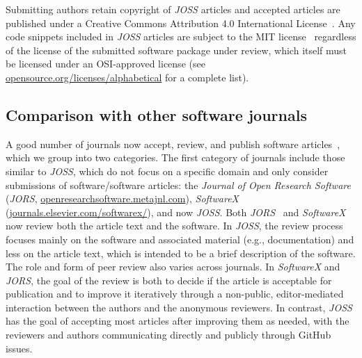 \documentclass{article}
\newcommand\joss{\textit{JOSS}}
\begin{document}
Submitting authors retain copyright of \joss{} articles and accepted articles are published under a Creative Commons Attribution 4.0 International License~\cite{cc}.
Any code snippets included in \joss{} articles are subject to the MIT license~\cite{mit} regardless of the license of the submitted software package under review, which itself must be licensed under an OSI-approved license (see \href{https://opensource.org/licenses/alphabetical}{opensource.org/licenses/alphabetical} for a complete list).


\subsection{Comparison with other software journals}
\label{comparison}

A good number of journals now accept, review, and publish software articles~\cite{software-papers-list},
which we group into two categories.
The first category of journals include those similar to \joss{}, which do not focus on a specific domain and only consider submissions of software\slash software articles:
the \textit{Journal of Open Research Software} (\textit{JORS},
\href{http://openresearchsoftware.metajnl.com}{openresearchsoftware.metajnl.com}),
\textit{SoftwareX}
(\href{https://www.journals.elsevier.com/softwarex/}{journals.elsevier.com/softwarex/}), and now \joss{}.
Both \textit{JORS}~\cite{jorsreview} and \textit{SoftwareX}~\cite{els-software}
now review both the article text and the software.
In \joss{}, the review process focuses mainly on the software and associated material (e.g., documentation) and less on the article text, which is intended to be a brief description of the software.
The role and form of peer review also varies across journals.
In \textit{SoftwareX} and \textit{JORS}, the goal of the review is both to decide if the article is acceptable for publication and to improve it iteratively through a non-public, editor-mediated interaction between the authors and the anonymous reviewers.
In contrast, \joss{} has the goal of accepting most articles after improving them as needed, with the reviewers and authors communicating directly and publicly through GitHub issues.
\end{document}
